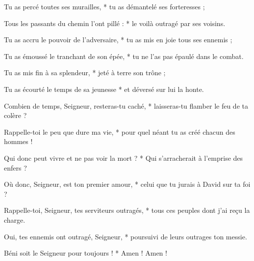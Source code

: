 \item Tu as percé toutes ses murailles, * tu as démantelé ses forteresses ;
\item Tous les passants du chemin l'ont pillé : * le voilà outragé par ses voisins.
\item Tu as accru le pouvoir de l'adversaire, * tu as mis en joie tous ses ennemis ;
\item Tu as émoussé le tranchant de son épée, * tu ne l'as pas épaulé dans le combat.
\item Tu as mis fin à sa splendeur, * jeté à terre son trône ;
\item Tu as écourté le temps de sa jeunesse * et déversé sur lui la honte.
\item Combien de temps, Seigneur, resteras-tu caché, * laisseras-tu flamber le feu de ta colère ?
\item Rappelle-toi le peu que dure ma vie, * pour quel néant tu as créé chacun des hommes !
\item Qui donc peut vivre et ne pas voir la mort ? * Qui s'arracherait à l'emprise des enfers ?
\item Où donc, Seigneur, est ton premier amour, * celui que tu jurais à David sur ta foi ?
\item Rappelle-toi, Seigneur, tes serviteurs outragés, * tous ces peuples dont j'ai reçu la charge.
\item Oui, tes ennemis ont outragé, Seigneur, * poursuivi de leurs outrages ton messie.
\item Béni soit le Seigneur pour toujours ! * Amen ! Amen !
